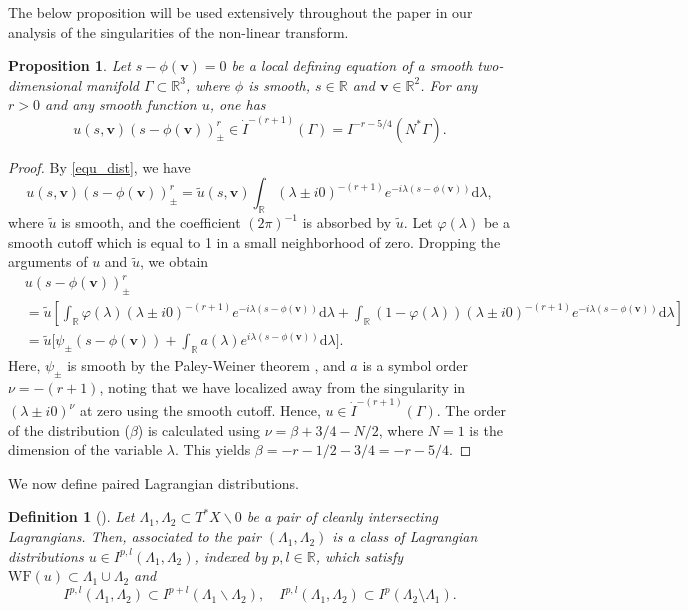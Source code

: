 \documentclass[11pt]{article}
\newcommand{\be}{\begin{equation}}
\newcommand{\ee}{\end{equation}}
\newcommand{\q}{\nu}
\newcommand{\WF}{\mathrm{WF}}
\newcommand{\br}{\mathbb{R}}
\newcommand{\dd}{\mathrm{d}}
\numberwithin{equation}{section}
\newcommand{\vv}{\mathbf{v}}
\newtheorem{proposition}[theorem]{Proposition}
\newtheorem{definition}[theorem]{Definition}
\theoremstyle{definition}
\begin{document}
The below proposition will be used extensively throughout the paper in our analysis of the singularities of the non-linear transform.
\begin{proposition}
\label{prop_sqrt}
Let $s - \phi(\vv) = 0$ be a local defining equation of a smooth two-dimensional manifold $\Gamma\subset\br^3$, where $\phi$ is smooth, $s\in \br$ and $\vv \in \br^2$. For any $r >0$ and any smooth function $u$, one has
\be
\label{dist_order_0}
u(s,\vv)(s - \phi(\vv))^r_\pm \in \dot{I}^{-(r+1)}(\Gamma)=I^{-r-5/4}(N^*\Gamma).
\ee
\end{proposition}
\begin{proof}
By \eqref{equ_dist}, we have
\be
u(s,\vv)(s - \phi(\vv))^r_\pm = \tilde{u}(s,\vv)\int_{\br}(\lambda \pm i0)^{-(r+1)} e^{-i \lambda (s- \phi(\vv))} \dd\lambda,
\ee
where $\tilde{u}$ is smooth, and the coefficient $(2\pi)^{-1}$ is absorbed by $\tilde u$. Let $\varphi(\lambda)$ be a smooth cutoff which is equal to 1 in a small neighborhood of zero. Dropping the arguments of $u$ and $\tilde u$, we obtain
\be
\begin{split}
&u(s - \phi(\vv))^r_\pm\\ 
&= \tilde{u}\left[ \int_{\br}\varphi(\lambda)(\lambda \pm i0)^{-(r+1)} e^{-i \lambda (s- \phi(\vv))} \dd\lambda + \int_{\br}(1- \varphi(\lambda)) (\lambda \pm i0)^{-(r+1)} e^{-i \lambda (s- \phi(\vv))} \dd\lambda \right]\\
&= \tilde{u}\Big[ \psi_{\pm}(s- \phi(\vv)) + \int_{\br}a(\lambda) e^{i \lambda (s- \phi(\vv))} \dd\lambda\Big].
\end{split}
\ee
Here, $\psi_{\pm}$ is smooth by the Paley-Weiner theorem \cite{paley1934fourier}, and $a$ is a symbol order $\q = -(r+1)$, noting that we have localized away from the singularity in $(\lambda \pm i0)^{\q}$ at zero using the smooth cutoff. Hence, $u\in\dot{I}^{-(r+1)}(\Gamma)$. The order of the distribution ($\beta$) is calculated using $\q = \beta + 3/4 - N/2$, where $N = 1$ is the dimension of the variable $\lambda$. This yields $\beta = -r-1/2-3/4=-r-5/4$.
\end{proof}

We now define paired Lagrangian distributions.

\begin{definition}[\cite{greenleaf1993recovering}]
\label{pair_lag}
Let $\Lambda_1,\Lambda_2 \subset T^*X\backslash 0$ be a pair of cleanly intersecting Lagrangians. Then, associated to the pair $(\Lambda_1, \Lambda_2)$ is a class of Lagrangian distributions $u\in I^{p,l}(\Lambda_1, \Lambda_2)$, indexed by $p,l\in \br$, which satisfy $\WF(u) \subset \Lambda_1 \cup \Lambda_2$ and 
\be
I^{p,l}(\Lambda_1,\Lambda_2) \subset I^{p+l}(\Lambda_1 \backslash \Lambda_2),\quad   I^{p,l}(\Lambda_1,\Lambda_2) \subset I^p(\Lambda_2\setminus\Lambda_1).
\ee
\end{definition}
\end{document}
